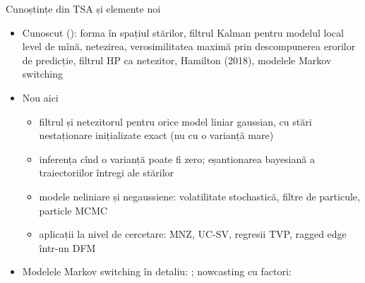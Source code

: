 \begin{frame}{Cunoștințe din TSA și elemente noi}
\itemsize{\small}
\begin{itemize}
    \item Cunoscut (): forma în spațiul stărilor, filtrul Kalman pentru modelul local level de mînă, netezirea, verosimilitatea maximă prin descompunerea erorilor de predicție, filtrul HP ca netezitor, Hamilton (2018), modelele Markov switching
    \item Nou aici
    \begin{itemize}
        \item filtrul și netezitorul pentru orice model liniar gaussian, cu stări nestaționare inițializate exact (nu cu o varianță mare)
        \item inferența cînd o varianță poate fi zero; eșantionarea bayesiană a traiectoriilor întregi ale stărilor
        \item modele neliniare și negaussiene: volatilitate stochastică, filtre de particule, particle MCMC
        \item aplicații la nivel de cercetare: MNZ, UC-SV, regresii TVP, ragged edge într-un DFM
    \end{itemize}
    \item Modelele Markov switching în detaliu: ; nowcasting cu factori: 
\end{itemize}
\end{frame}

